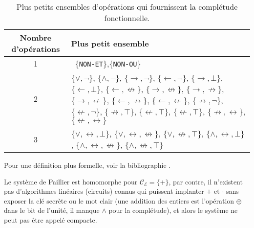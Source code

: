 \begin{table}[H]
\caption{Plus petits ensembles d'opérations qui fournissent la complétude fonctionnelle.}
\label{table:operations}
\center
\begin{tabular}{|c|m{6cm}|}
\hline
Nombre d'opérations & Plus petit ensemble \\
\hline
\hline
	1	& \ $\{$\verb!NON-ET!$\}$,$\{$\verb!NON-OU!$\}$ \\
		\hline
	2	& $\{\vee,\neg\}$, %
		$\{\wedge,\neg\}$, %
		$\{\rightarrow,\neg\}$, %
		$\{\leftarrow,\neg\}$, %
		$\{\rightarrow,\bot\}$, %
		$\{\leftarrow,\bot\}$, %
		$\{\leftarrow,\not\leftrightarrow\}$, %
		$\{\rightarrow,\not\leftrightarrow\}$, %
		$\{\rightarrow,\not\rightarrow\}$, %
		$\{\rightarrow,\not\leftarrow\}$, %
		$\{\leftarrow,\not\rightarrow\}$, %
		$\{\leftarrow,\not\leftarrow\}$, %
		$\{\not\rightarrow,\neg\}$, %
		$\{\not\leftarrow,\neg\}$, %
		$\{\not\rightarrow,\top\}$, %
		$\{\not\leftarrow,\top\}$, %
		$\{\not\leftarrow,\top\}$, %
		$\{\not\rightarrow,\leftrightarrow\}$, %
		$\{\not\leftarrow,\leftrightarrow\}$ \\
			\hline
	3 	& $\{\lor,\leftrightarrow,\bot\}$,%
		$\{\lor,\leftrightarrow,\not\leftrightarrow\}$,%
		$\{\lor,\not\leftrightarrow,\top\}$,%
		$\{\land,\leftrightarrow, \bot\}$,%
		$\{\land,\leftrightarrow,\not\leftrightarrow\}$,%
		$\{\land,\not\leftrightarrow,\top\}$\\
		\hline
\end{tabular}
\end{table}

Pour une définition plus formelle, voir la bibliographie \cite{homenc}.


Le système de Paillier est homomorphe pour $\mathcal{C}_\mathcal{E}= \{+\}$, par contre, il n'exis\-tent pas 
d'algorithmes linéaires (circuits) connus qui puissent implanter $+$ et $\cdot$ sans exposer la clé secrète ou 
le mot clair (une addition des entiers est l'opé\-ra\-tion $\oplus$ dans le bit de l'unité, il manque $\wedge$  
pour la complétude), et alors le système ne peut pas être appelé compacte.


%

